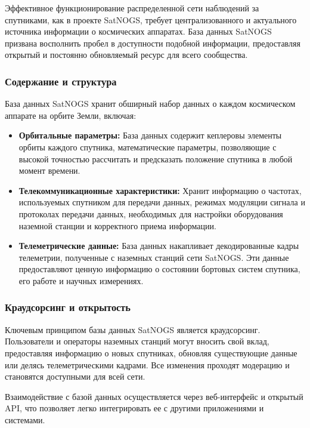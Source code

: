 \documentclass[14pt, a4paper]{../cls/coursework}
\begin{document}
    Эффективное функционирование распределенной сети наблюдений за спутниками, как в проекте SatNOGS, требует централизованного и актуального источника информации о космических аппаратах.
    База данных SatNOGS призвана восполнить пробел в доступности подобной информации, предоставляя открытый и постоянно обновляемый ресурс для всего сообщества.

    \subsubsection{Содержание и структура}

    База данных SatNOGS хранит обширный набор данных о каждом космическом аппарате на орбите Земли, включая:

    \begin{itemize}
        \item \textbf{Орбитальные параметры:} База данных содержит кеплеровы элементы орбиты каждого спутника,  математические параметры, позволяющие с высокой точностью рассчитать и предсказать положение спутника в любой момент времени.
        \item \textbf{Телекоммуникационные характеристики:} Хранит информацию о частотах, используемых спутником для передачи данных,  режимах модуляции сигнала и протоколах передачи данных, необходимых для настройки оборудования наземной станции и корректного приема информации.
        \item \textbf{Телеметрические данные:}  База данных накапливает декодированные кадры телеметрии, полученные с наземных станций сети SatNOGS. Эти данные предоставляют ценную информацию о состоянии бортовых систем спутника, его работе и научных измерениях.
    \end{itemize}

    \subsubsection{Краудсорсинг и открытость}

    Ключевым принципом базы данных SatNOGS является краудсорсинг.
    Пользователи и операторы наземных станций могут вносить свой вклад, предоставляя информацию о новых спутниках, обновляя существующие данные или делясь телеметрическими кадрами.
    Все изменения проходят модерацию и становятся доступными для всей сети.

    Взаимодействие с базой данных осуществляется через веб-интерфейс и открытый API, что позволяет легко интегрировать ее с другими приложениями и системами.
\end{document}
